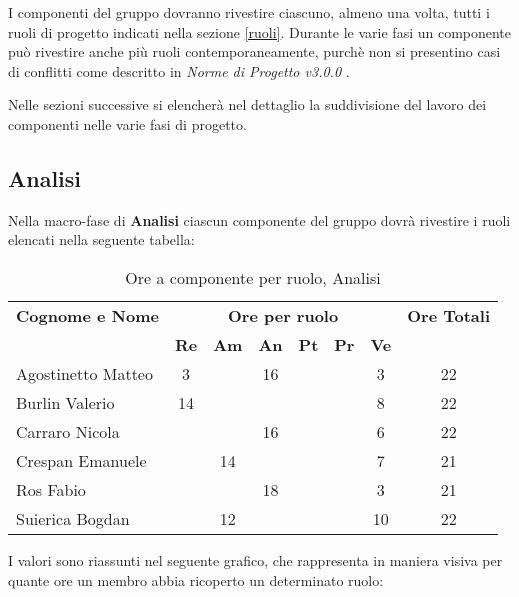 I componenti del gruppo dovranno rivestire ciascuno, almeno una volta, tutti i ruoli di progetto indicati nella sezione \ref{ruoli}. Durante le varie fasi un componente può rivestire anche più ruoli contemporaneamente, purchè non si presentino casi di conflitti come descritto in \textit{Norme di Progetto v3.0.0} .

\noindent Nelle sezioni successive si elencherà nel dettaglio la suddivisione del lavoro dei componenti nelle varie fasi di progetto.

\subsection{Analisi}
Nella macro-fase di \textbf{Analisi} ciascun componente del gruppo dovrà rivestire i ruoli elencati nella seguente tabella:

\begin{table}[h]
\centering
\begin{tabular}{|l|c|c|c|c|c|c|c|}
\toprule
	\textbf{Cognome e Nome} & \multicolumn{6}{c}{\textbf{Ore per ruolo}} & \textbf{Ore Totali} \\
	& \textbf{Re} & \textbf{Am} & \textbf{An} & \textbf{Pt} & \textbf{Pr} & \textbf{Ve} & \\
	 
\midrule
	Agostinetto Matteo & 3 & & 16 & & & 3 & 22 \\
	Burlin Valerio & 14 & & & & & 8 & 22 \\ 
	Carraro Nicola & & & 16 & & & 6 & 22 \\
	Crespan Emanuele & & 14 & & & & 7 & 21 \\
	Ros Fabio & & & 18 & & & 3 & 21 \\
	Suierica Bogdan & & 12 & & & & 10 & 22 \\

\bottomrule
\end{tabular}
\caption{Ore a componente per ruolo, Analisi}
\end{table}

\noindent I valori sono riassunti nel seguente grafico, che rappresenta in maniera visiva per quante ore un membro abbia ricoperto un determinato ruolo:

